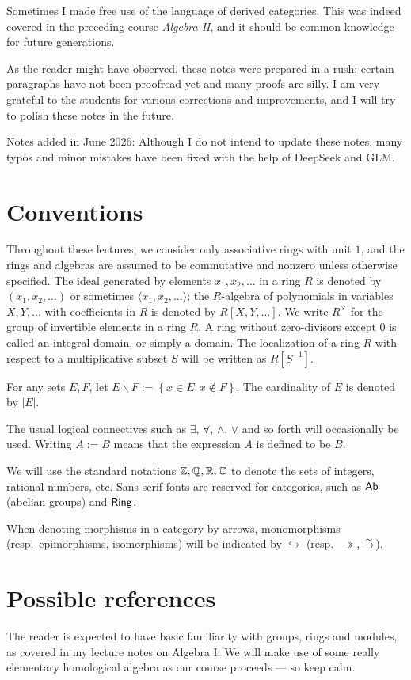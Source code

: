 Sometimes I made free use of the language of derived categories. This was indeed covered in the preceding course \emph{Algebra II}, and it should be common knowledge for future generations.

As the reader might have observed, these notes were prepared in a rush; certain paragraphs have not been proofread yet and many proofs are silly. I am very grateful to the students for various corrections and improvements, and I will try to polish these notes in the future.

{\small Notes added in June 2026: Although I do not intend to update these notes, many typos and minor mistakes have been fixed with the help of DeepSeek and GLM.}

\section*{Conventions}
Throughout these lectures, we consider only associative rings with unit $1$, and the rings and algebras are assumed to be commutative and nonzero unless otherwise specified. The ideal generated by elements $x_1, x_2, \ldots$ in a ring $R$ is denoted by $(x_1, x_2, \ldots)$ or sometimes $\langle x_1, x_2, \ldots \rangle$; the $R$-algebra of polynomials in variables $X, Y, \ldots$ with coefficients in $R$ is denoted by $R[X, Y, \ldots]$. We write $R^\times$ for the group of invertible elements in a ring $R$. A ring without zero-divisors except $0$ is called an integral domain, or simply a domain. The localization of a ring $R$ with respect to a multiplicative subset $S$ will be written as $R[S^{-1}]$.

For any sets $E, F$, let $E \smallsetminus F := \left\{ x \in E: x \notin F \right\}$. The cardinality of $E$ is denoted by $|E|$.

The usual logical connectives such as $\exists$, $\forall$, $\wedge$, $\vee$ and so forth will occasionally be used. Writing $A := B$ means that the expression $A$ is defined to be $B$.

We will use the standard notations $\mathbb{Z}, \mathbb{Q}, \mathbb{R}, \mathbb{C}$ to denote the sets of integers, rational numbers, etc. Sans serif fonts are reserved for categories, such as $\mathsf{Ab}$ (abelian groups) and $\mathsf{Ring}$. 

When denoting morphisms in a category by arrows, monomorphisms (resp.\ epimorphisms, isomorphisms) will be indicated by $\hookrightarrow$ (resp.\ $\twoheadrightarrow$, $\stackrel{\sim}{\rightarrow}$).

\section*{Possible references}
The reader is expected to have basic familiarity with groups, rings and modules, as covered in my lecture notes on Algebra I. We will make use of some really elementary homological algebra as our course proceeds --- so keep calm.

